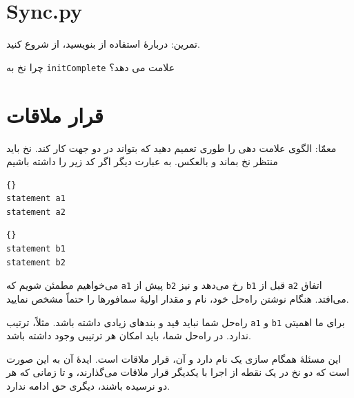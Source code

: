 \documentclass{book}
\begin{document}
\section{Sync.py}
\label{sync.py}
    تمرین: دربارهٔ استفاده از  بنویسید، از  شروع کنید.

چرا نخ  به \texttt{initComplete} علامت می دهد؟


\section{قرار ملاقات}
\label{rendezvous}

معمّا: الگوی علامت دهی را طوری تعمیم دهید که بتواند در دو جهت کار کند. 
نخ  باید منتظر نخ  بماند و بالعکس. به عبارت دیگر اگر کد زیر را داشته باشیم

\begin{latin}
\begin{minipage}[t]{2in}
\begin{latin}
\begin{lstlisting}[title=\rl{نخ \lr{A}}]{}
statement a1
statement a2
\end{lstlisting}
\end{latin}
\end{minipage}
\hfill
\begin{minipage}[t]{2in}
\begin{latin}
\begin{lstlisting}[title=\rl{نخ \lr{B}}]{}
statement b1
statement b2
\end{lstlisting}
\end{latin}
\end{minipage}
\end{latin}

%
می‌خواهیم مطمئن شویم که \texttt{a1} پیش از \texttt{b2} رخ می‌دهد و نیز \texttt{b1} قبل از \texttt{a2} اتفاق می‌افتد. 
هنگام نوشتن راه‌حل خود، نام و مقدار اولیهٔ سمافورها را حتماً مشخص نمایید.

راه‌حل شما نباید قید و بندهای زیادی داشته باشد. مثلاً، ترتیب \texttt{a1} و \texttt{b1} برای ما اهمیتی ندارد. 
در راه‌حل شما، باید امکان هر ترتیبی وجود داشته باشد.

این مسئلهٔ همگام سازی یک نام دارد و‌ آن، قرار ملاقات است. ایدهٔ آن به این صورت است که دو نخ در یک نقطه از اجرا با یکدیگر قرار ملاقات می‌گذارند، 
و تا زمانی که هر دو نرسیده باشند، دیگری حق ادامه ندارد.
\end{document}
